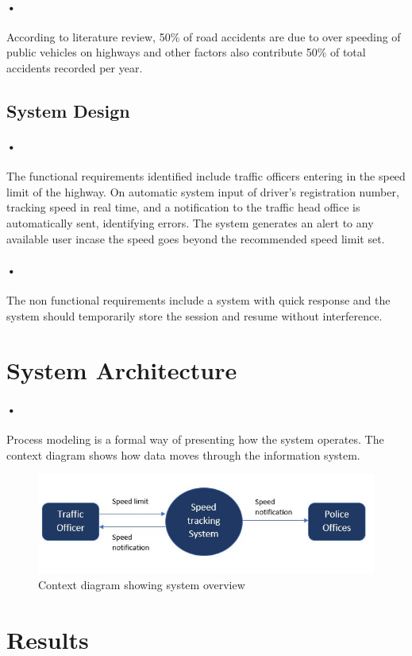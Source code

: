\documentclass[12pt]{report}
\begin{document}
\paragraph{•}
According to literature review, 50\% of road accidents are due to over speeding of public vehicles on highways and other factors also contribute 50\% of total accidents recorded per year.\cite{mukreport}
\subsection{System Design}
\paragraph{•}
The functional requirements identified include traffic officers entering in the speed limit of the highway. On automatic system input of driver's registration number, tracking speed in real time, and a notification to the traffic head office is automatically sent, identifying errors. The system generates an alert to any available user incase the speed goes beyond the recommended speed limit set.
\paragraph{•}
The non functional requirements include a system with quick response and the system should temporarily store the session and resume without interference.
\section{System Architecture}
\paragraph{•}
Process modeling is a formal way of presenting how the system operates. The context diagram shows how data moves through the information system.
\begin{figure}[ht]
\includegraphics[scale=0.8]{dfd}
\caption{Context diagram showing system overview}
\end{figure} 
\section{Results}
\end{document}
